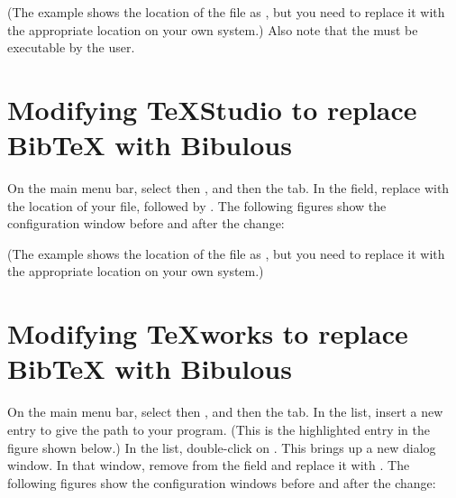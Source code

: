 \documentclass[letterpaper,10pt,english]{sphinxmanual}
\begin{document}
\noindent{}

\noindent{}

(The example shows the location of the  file as , but you need to replace it with the appropriate location on your own system.) Also note that the  must be executable by the user.


\section{Modifying TeXStudio to replace BibTeX with Bibulous}
\label{\detokenize{getting_started:modifying-texstudio-to-replace-bibtex-with-bibulous}}
On the main menu bar, select  then , and then the  tab. In the  field, replace  with the location of your  file, followed by . The following figures show the configuration window before and after the change:

\noindent{}

\noindent{}

(The example shows the location of the  file as , but you need to replace it with the appropriate location on your own system.)


\section{Modifying TeXworks to replace BibTeX with Bibulous}
\label{\detokenize{getting_started:modifying-texworks-to-replace-bibtex-with-bibulous}}
On the main menu bar, select  then , and then the  tab. In the  list, insert a new entry to give the path to your  program. (This is the highlighted entry in the figure shown below.) In the  list, double-click on . This brings up a new dialog window. In that window, remove  from the  field and replace it with . The following figures show the configuration windows before and after the change:
\end{document}
